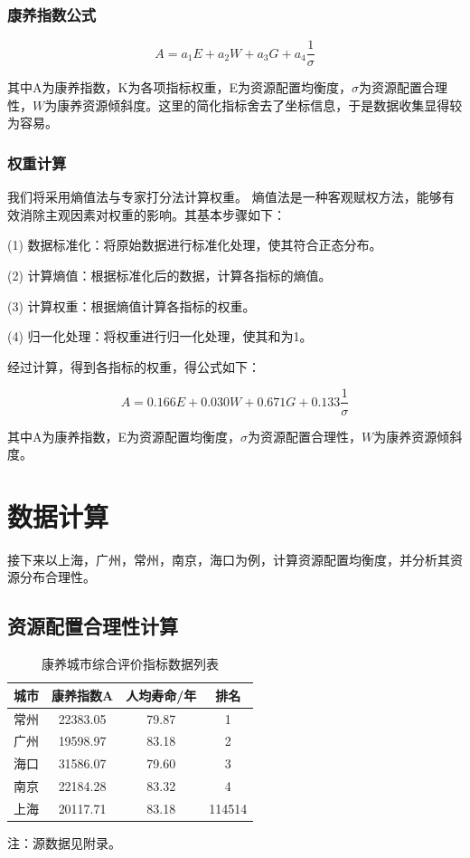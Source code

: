 \documentclass[12pt,a4paper]{article}
\begin{document}
\subsubsection{康养指数公式}

\[
A = a_1E + a_2W + a_3G + a_4\frac{1}{\sigma}
\]

其中A为康养指数，K为各项指标权重，E为资源配置均衡度，$\sigma$为资源配置合理性，$W$为康养资源倾斜度。这里的简化指标舍去了坐标信息，于是数据收集显得较为容易。

\subsubsection{权重计算}

我们将采用熵值法\cite{02}与专家打分法计算权重。
熵值法是一种客观赋权方法，能够有效消除主观因素对权重的影响。其基本步骤如下：

(1) 数据标准化：将原始数据进行标准化处理，使其符合正态分布。

(2) 计算熵值：根据标准化后的数据，计算各指标的熵值。

(3) 计算权重：根据熵值计算各指标的权重。

(4) 归一化处理：将权重进行归一化处理，使其和为1。

经过计算，得到各指标的权重，得公式如下：

\[
A = 0.166E + 0.030W + 0.671G + 0.133\frac{1}{\sigma}
\]

其中A为康养指数，E为资源配置均衡度，$\sigma$为资源配置合理性，$W$为康养资源倾斜度。


\section{数据计算}

接下来以上海，广州，常州，南京，海口为例，计算资源配置均衡度，并分析其资源分布合理性。
\subsection{资源配置合理性计算}

\begin{table}[h]
  \centering
  \caption{康养城市综合评价指标数据列表}
  \begin{tabular}{c|c|c|c}
    \toprule[2pt]
    城市 &康养指数A&人均寿命/年&排名\\
    \midrule[1pt]
    常州 & 22383.05 & 79.87 & 1 \\
    广州 & 19598.97 & 83.18 & 2 \\
    海口 & 31586.07 & 79.60 & 3 \\
    南京 & 22184.28 & 83.32 & 4 \\
    上海 & 20117.71 & 83.18 & 114514 \\
    \bottomrule[2pt]
  \end{tabular}

  \vspace{0.5em}
  {\footnotesize 注：源数据见附录。}
\end{table}
\end{document}
